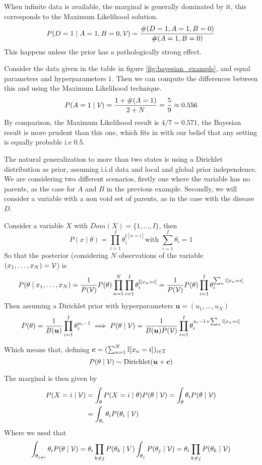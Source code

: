  When infinite data is available, the marginal is generally dominated by it,
 this corresponds to the Maximum Likelihood solution.
 \[
   P(D = 1 \mid A = 1, B = 0, \mathcal{V}) = \frac{\#(D = 1, A = 1 , B = 0)}{\#(A = 1, B = 0)}
 \]
 This happens unless the prior has a pathologically strong effect.

 Consider the data given in the table in figure \ref{fig:bayesian_example}, and
 equal parameters and hyperparameters \(1\). Then we can compute the differences
 between this and using the Maximum Likelihood technique.
 \[
   P(A = 1 \mid \mathcal{V}) = \frac{1 + \#(A = 1)}{2 + N} = \frac{5}{9} \approx 0.556
 \]
 By comparison, the Maximum Likelihood result is \(4/7 = 0.571\), the Bayesian
 result is more prudent than this one, which fits in with our belief that any
 setting is equally probable i.e \(0.5\).


 The natural generalization to more than two states is using a Dirichlet
 distribution as prior, assuming i.i.d data and local and global prior
 independence. We are considering two different scenarios, firstly one where the
 variable has no parents, as the case for \(A\) and \(B\) in the previous
 example. Secondly, we will consider a variable with a non void set of parents,
 as in the case with the disease \(D\).

 Consider a variable \(X\) with \(Dom(X) = \{1, \dots, I\}\), then
 \[
   P(x \mid \theta) = \prod_{i = 1}^{I}\theta_{i}^{\mathbb{I}[x = i]} \text{
   with  } \sum_{i=1}^{I}\theta_{i} = 1
\]
So that the posterior (considering \(N\) observations of the variable
\((x_{1}, \dots, x_{N}) = \mathcal{V}\)) is
\[
  P(\theta \mid x_{1},\dots,x_{N}) = \frac{1}{P(\mathcal{V})} P(\theta) \prod_{n = 1}^{N}\prod_{i =1 }^{I}\theta_{i}^{\mathbb{I}[x_{n} = i]} =  \frac{1}{P(\mathcal{V})} P(\theta) \prod_{i = 1}^{I} \theta_{i}^{\sum_{n} \mathbb{I}[x_{n}=i]}
\]
Then assuming a Dirichlet prior with hyperparameters \(\bm{u} = (u_{1}, \dots, u_{N})\)
\[
  P(\theta) = \frac{1}{B(\bm{u})}\prod_{i =1}^{I}\theta_{i}^{u_{i}-1} \implies P(\theta \mid \mathcal{V}) = \frac{1}{B(\bm{u})P(\mathcal{V})}\prod_{i=1}^{I}\theta_{i}^{u_{i}-1 + \sum_{n}\mathbb{I}[x_{n} = i]}
\]

Which means that, defining \(\bm{c} = ( \sum_{n=1}^{N}\mathbb{I}[x_{n} = i])_{i \in \mathcal{I}}\)
\[
  P(\theta \mid \mathcal{V}) \sim \text{Dirichlet}(\bm{u} + \bm{c})
\]

The marginal is then given by
\[
  \begin{aligned}
    P(X=i \mid \mathcal{V}) &= \int_{\theta}P(X=i \mid \theta)P(\theta \mid \mathcal{V}) =  \int_{\theta}\theta_{i}P(\theta \mid \mathcal{V})\\
    &=  \int_{\theta_{i}}\theta_{i}P(\theta_{i} \mid \mathcal{V})
\end{aligned}
\]
Where we used that
\[\int_{\theta_{j \neq i}}\theta_{i} P(\theta \mid \mathcal{V}) = \theta_{i}\prod_{k\neq j}P(\theta_{k} \mid V) \int_{\theta_{j}}P(\theta_{j}\mid \mathcal{V}) = \theta_{i} \prod_{k \neq j}P(\theta_{k} \mid \mathcal{V})\]


